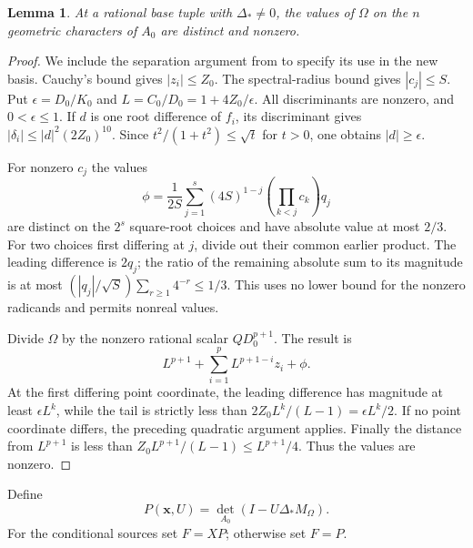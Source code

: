 \documentclass[11pt,a4paper]{article}
\newtheorem{lemma}[theorem]{Lemma}
\theoremstyle{remark}\newtheorem{remark}[theorem]{Remark}
\begin{document}
\begin{lemma}\label{lem:separator}
At a rational base tuple with $\Delta_*\ne0$, the values of $\Omega$
on the $n$ geometric characters of $A_0$ are distinct and nonzero.
\end{lemma}
\begin{proof}
We include the separation argument from \cite{Triangular} to specify
its use in the new basis. Cauchy's bound gives $|z_i|\le Z_0$.
The spectral-radius bound gives $|c_j|\le S$. Put
$\epsilon=D_0/K_0$ and $L=C_0/D_0=1+4Z_0/\epsilon$.
All discriminants are nonzero, and $0<\epsilon\le1$.
If $d$ is one root difference of $f_i$, its discriminant gives
$|\delta_i|\le |d|^2(2Z_0)^{10}$. Since
$t^2/(1+t^2)\le\sqrt t$ for $t>0$, one obtains $|d|\ge\epsilon$.

For nonzero $c_j$ the values
\[
 \phi=\frac1{2S}\sum_{j=1}^s(4S)^{1-j}
                       \left(\prod_{k<j}c_k\right)q_j
\]
are distinct on the $2^s$ square-root choices and have absolute value
at most $2/3$. For two choices first differing at $j$, divide out their
common earlier product. The leading difference is $2q_j$; the ratio
of the remaining absolute sum to its magnitude is at most
$(|q_j|/\sqrt S)\sum_{r\ge1}4^{-r}\le1/3$. This uses no lower
bound for the nonzero radicands and permits nonreal values.

Divide $\Omega$ by the nonzero rational scalar $QD_0^{p+1}$. The result is
\[
 L^{p+1}+\sum_{i=1}^pL^{p+1-i}z_i+\phi.
\]
At the first differing point coordinate, the leading difference has
magnitude at least $\epsilon L^k$, while the tail is strictly less
than $2Z_0L^k/(L-1)=\epsilon L^k/2$. If no point coordinate differs,
the preceding quadratic argument applies. Finally the distance from
$L^{p+1}$ is less than
$Z_0L^{p+1}/(L-1)\le L^{p+1}/4$. Thus the values are nonzero.
\end{proof}

Define
\begin{equation}\label{eq:finaldet}
                       P(\boldsymbol x,U)=
                       \det_{A_0}(I-U\Delta_*M_\Omega).
\end{equation}
For the conditional sources set $F=XP$; otherwise set $F=P$.
\end{document}
